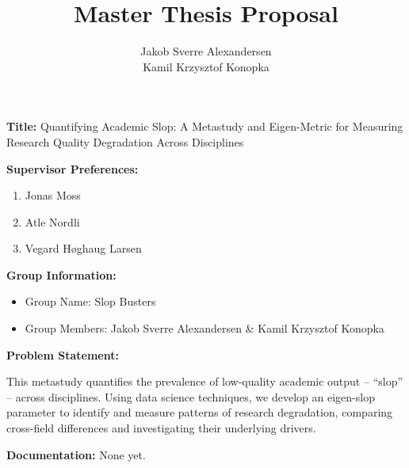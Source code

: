 \documentclass[10pt]{article}
\begin{document}
 
\title{Master Thesis Proposal}
\author{Jakob Sverre Alexandersen\\Kamil Krzysztof Konopka}
\maketitle
\textbf{Title:} Quantifying Academic Slop: A Metastudy and Eigen-Metric for Measuring Research Quality Degradation Across Disciplines

\textbf{Supervisor Preferences:}
\begin{enumerate}
    \item Jonas Moss
    \item Atle Nordli 
    \item Vegard Høghaug Larsen
\end{enumerate}

\textbf{Group Information:}
\begin{itemize}
    \item Group Name: Slop Busters 
    \item Group Members: Jakob Sverre Alexandersen \& Kamil Krzysztof Konopka
\end{itemize}

\textbf{Problem Statement:}

This metastudy quantifies the prevalence of low-quality academic output -- ``slop'' -- across disciplines. Using data science techniques, we develop an eigen-slop parameter to identify and measure patterns of research degradation, comparing cross-field differences and investigating their underlying drivers.

\textbf{Documentation:} None yet. 
\end{document}
